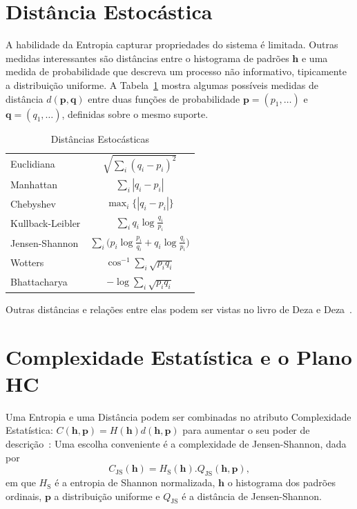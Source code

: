 \documentclass[12pt]{article}
\begin{document}
\section{Distância Estocástica}
\label{sec:quatro}

A habilidade da Entropia capturar propriedades do sistema é limitada.
Outras medidas interessantes são distâncias entre o histograma de padrões $\bm h$ e uma medida de probabilidade que descreva um processo não informativo, tipicamente a distribuição uniforme.
A Tabela~\ref{Tab:Distancias} mostra algumas possíveis medidas de distância $d(\bm p,\bm q)$ entre duas funções de probabilidade $\bm p=(p_1,\dots)$ e $\bm q=(q_1,\dots)$, definidas sobre o mesmo suporte.

\begin{table}[hbt]
\caption{Distâncias Estocásticas}\label{Tab:Distancias}
\centering
\begin{tabular}{lc}\toprule
Euclidiana					& $ \sqrt{\sum_i(q_i-p_i)^{2}}$\\
Manhattan					& $ \sum_{i}|q_i-p_i|$\\
Chebyshev					& $ \max_i\{|q_i-p_i|\}$\\
Kullback-Leibler			& $ \sum_{i}q_i \log\frac{q_i}{p_i}$\\
Jensen-Shannon				& $ \sum_{i} \Big(p_i \log\frac{p_i}{q_i} + q_i \log\frac{q_i}{p_i}\Big)$\\
Wotters						& $ \cos^{-1}\sum_{i} \sqrt{p_i q_i}$ \\
Bhattacharya				& $ -\log\sum_{i}\sqrt{p_i q_i}$ \\
\bottomrule
\end{tabular}
\end{table}

Outras distâncias e relações entre elas podem ser vistas no livro de Deza e Deza~\cite{EncyclopediaofDistances}.

\section{Complexidade Estatística e o Plano HC}
\label{sec:cinco}

Uma Entropia e uma Distância podem ser combinadas no atributo Complexidade Estatística: $C(\bm h, \bm p) = H(\bm h)d(\bm h, \bm p)$ para aumentar o seu poder de descrição~\cite{article5,FELDMAN1998244,LOPEZRUIZ1995321}:
Uma escolha conveniente é a complexidade de Jensen-Shannon, dada por
 \begin{equation}
 C_{\text{JS}}(\bm h) = H_{\text{S}}(\bm h) . Q_{\text{JS}}(\bm h, \bm p),
 \end{equation}
em que $H_{\text{S}}$ é a entropia de Shannon normalizada, $\bm h$ o histograma dos padrões ordinais, $\bm p$ a distribuição uniforme e $Q_{\text{JS}}$ é a distância de Jensen-Shannon.
 
\end{document}
